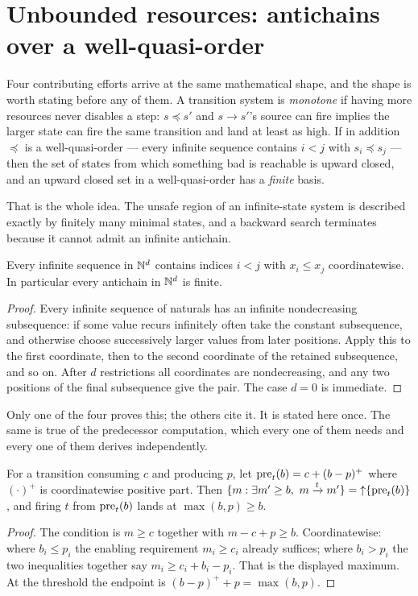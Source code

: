 \section{Unbounded resources: antichains over a well-quasi-order}
\label{sec:wsts}

Four contributing efforts arrive at the same mathematical shape, and the shape
is worth stating before any of them. A transition system is \emph{monotone} if
having more resources never disables a step: $s\preceq s'$ and $s\to s'$'s
source can fire implies the larger state can fire the same transition and land
at least as high. If in addition $\preceq$ is a well-quasi-order --- every
infinite sequence contains $i<j$ with $s_i\preceq s_j$ --- then the set of
states from which something bad is reachable is upward closed, and an upward
closed set in a well-quasi-order has a \emph{finite} basis.

That is the whole idea. The unsafe region of an infinite-state system is
described exactly by finitely many minimal states, and a backward search
terminates because it cannot admit an infinite antichain.

\begin{lemma}[Dickson]\label{lem:dickson}
Every infinite sequence in $\mathbb{N}^d$ contains indices $i<j$ with $x_i\le x_j$
coordinatewise. In particular every antichain in $\mathbb{N}^d$ is finite.
\end{lemma}
\begin{proof}
Every infinite sequence of naturals has an infinite nondecreasing subsequence:
if some value recurs infinitely often take the constant subsequence, and
otherwise choose successively larger values from later positions. Apply this to
the first coordinate, then to the second coordinate of the retained
subsequence, and so on. After $d$ restrictions all coordinates are
nondecreasing, and any two positions of the final subsequence give the pair.
The case $d=0$ is immediate.
\end{proof}

Only one of the four proves this; the others cite it. It is stated here once.
The same is true of the predecessor computation, which every one of them needs
and every one of them derives independently.

\begin{lemma}\label{lem:backpre}
For a transition consuming $c$ and producing $p$, let
$\operatorname{pre}_t(b)=c+(b-p)^{+}$ where $(\cdot)^{+}$ is coordinatewise positive part.
Then $\{m: \exists m'\ge b,\ m\xrightarrow{t}m'\}={\uparrow}\{\operatorname{pre}_t(b)\}$, and
firing $t$ from $\operatorname{pre}_t(b)$ lands at $\max(b,p)\ge b$.
\end{lemma}
\begin{proof}
The condition is $m\ge c$ together with $m-c+p\ge b$. Coordinatewise: where
$b_i\le p_i$ the enabling requirement $m_i\ge c_i$ already suffices; where
$b_i>p_i$ the two inequalities together say $m_i\ge c_i+b_i-p_i$. That is the
displayed maximum. At the threshold the endpoint is $(b-p)^{+}+p=\max(b,p)$.
\end{proof}


